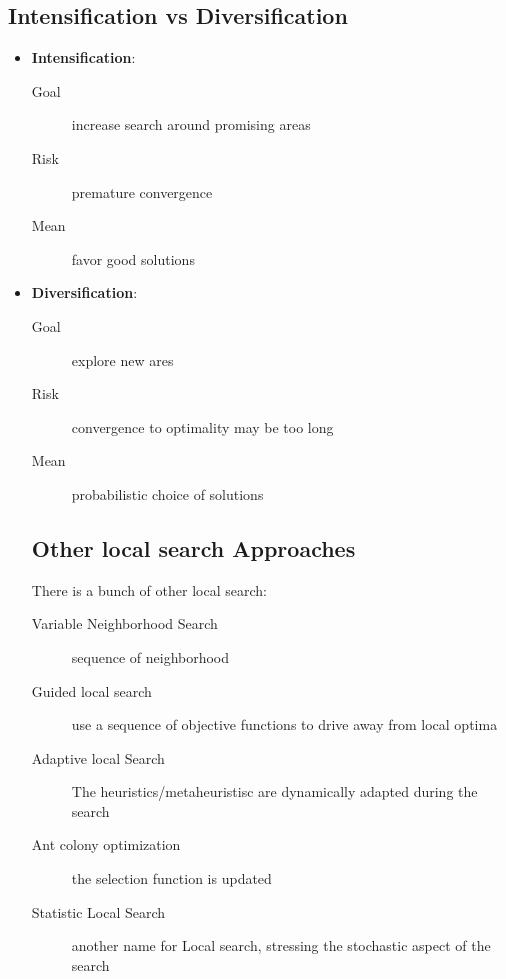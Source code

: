 \subsection{Intensification vs Diversification}

\begin{itemize}
\item \textbf{Intensification}:

	\begin{description}
		\item[Goal] increase search around promising areas
		\item[Risk] premature convergence
		\item[Mean] favor good solutions
	\end{description}

\item \textbf{Diversification}:
	 
	\begin{description}
		\item[Goal] explore new ares
		\item[Risk] convergence to optimality may be too long
		\item[Mean] probabilistic choice of solutions
	\end{description}

\subsection{Other local search Approaches}

There is a bunch of other local search:
\begin{description}
\item[Variable Neighborhood Search] sequence of neighborhood
\item[Guided local search] use a sequence of objective functions to drive away from local optima
\item[Adaptive local Search] The heuristics/metaheuristisc are dynamically adapted during the search
\item[Ant colony optimization] the selection function is updated
\item[Statistic Local Search] another name for Local search, stressing the stochastic aspect of the search
\end{description}

\end{itemize}



